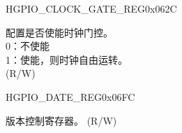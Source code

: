 \begin{register}{H}{GPIO\_CLOCK\_GATE\_REG}{0x062C}\label{regdesc:GPIOCLOCKGATEREG}
%
%
\regnewline%
\begin{regdesc}\begin{reglist}
\label{fielddesc:GPIOCLKEN}\item [GPIO\_CLK\_EN] 配置是否使能时钟门控。\\
0：不使能\\
1：使能，则时钟自由运转。\\(R/W)
\end{reglist}\end{regdesc}
\end{register}


\begin{register}{H}{GPIO\_DATE\_REG}{0x06FC}\label{regdesc:GPIOREGDATEREG}
%
%
\regnewline%
\begin{regdesc}\begin{reglist}
\label{fielddesc:GPIOREGDATE}\item [GPIO\_DATE] 版本控制寄存器。 (R/W)
\end{reglist}\end{regdesc}
\end{register}
